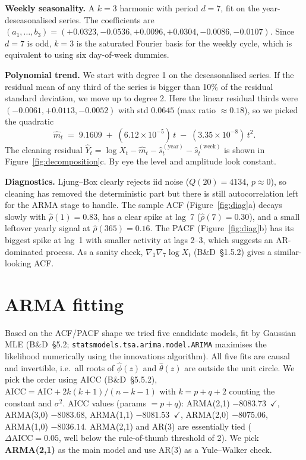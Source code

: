 \documentclass[11pt,a4paper]{article}
\begin{document}
\textbf{Weekly seasonality.} A $k=3$ harmonic with period $d=7$, fit on the
year-deseasonalised series. The coefficients are
$(a_1,\dots,b_3) = (+0.0323,-0.0536,+0.0096,+0.0304,-0.0086,-0.0107)$.
Since $d=7$ is odd, $k=3$ is the saturated Fourier basis for the weekly cycle,
which is equivalent to using six day-of-week dummies.

\textbf{Polynomial trend.} We start with degree 1 on the deseasonalised series.
If the residual mean of any third of the series is bigger than 10\% of the
residual standard deviation, we move up to degree 2. Here the linear residual
thirds were $(-0.0061,+0.0113,-0.0052)$ with std $0.0645$ (max ratio
$\approx 0.18$), so we picked the quadratic
\[
\hat m_t \;=\; 9.1609 \;+\; (6.12 \times 10^{-5})\,t \;-\; (3.35 \times 10^{-8})\,t^2.
\]
The cleaning residual
$\hat Y_t = \log X_t - \hat m_t - \hat s_t^{(\mathrm{year})} - \hat s_t^{(\mathrm{week})}$
is shown in Figure~\ref{fig:decomposition}c. By eye the level and amplitude
look constant.

\textbf{Diagnostics.} Ljung--Box clearly rejects iid noise
($Q(20) = 4134$, $p \approx 0$), so cleaning has removed the deterministic
part but there is still autocorrelation left for the ARMA stage to handle.
The sample ACF (Figure~\ref{fig:diag}a) decays slowly with
$\hat\rho(1) = 0.83$, has a clear spike at lag~7 ($\hat\rho(7) = 0.30$), and
a small leftover yearly signal at $\hat\rho(365) = 0.16$. The PACF
(Figure~\ref{fig:diag}b) has its biggest spike at lag~1 with smaller activity
at lags 2--3, which suggests an AR-dominated process. As a sanity check,
$\nabla_1 \nabla_7 \log X_t$ (B\&D~\S1.5.2) gives a similar-looking ACF.

\section{ARMA fitting}
Based on the ACF/PACF shape we tried five candidate models, fit by Gaussian
MLE (B\&D~\S5.2; \texttt{statsmodels.tsa.arima.model.ARIMA} maximises the
likelihood numerically using the innovations algorithm). All five fits are
causal and invertible, i.e.\ all roots of $\hat\phi(z)$ and $\hat\theta(z)$
are outside the unit circle. We pick the order using AICC (B\&D~\S5.5.2),
$\mathrm{AICC} = \mathrm{AIC} + 2k(k+1)/(n - k - 1)$ with $k = p + q + 2$
counting the constant and $\sigma^2$. AICC values (params $= p+q$):
ARMA(2,1) $-8083.73$~$\checkmark$, ARMA(3,0) $-8083.68$,
ARMA(1,1) $-8081.53$~$\checkmark$, ARMA(2,0) $-8075.06$, ARMA(1,0) $-8036.14$.
ARMA(2,1) and AR(3) are essentially tied ($\Delta\mathrm{AICC} = 0.05$, well
below the rule-of-thumb threshold of 2). We pick \textbf{ARMA(2,1)} as the
main model and use AR(3) as a Yule--Walker check.
\end{document}
